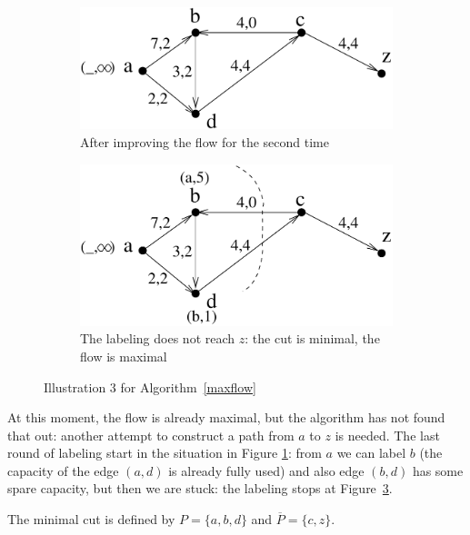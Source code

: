 \begin{figure}[ht]
	\centering
	\begin{subfigure}{0.41\linewidth}
		\vspace{1.2em}
		\centering
		\includegraphics[width=\linewidth,keepaspectratio]{maxflow5}
		\caption{After improving the flow for the second time}
		\label{maxflow5}
	\end{subfigure}\qquad\qquad
	\begin{subfigure}{0.41\linewidth}
		\centering
		\includegraphics[width=\linewidth,keepaspectratio]{maxflow6}
		\caption{The labeling does not reach $z$: the cut is minimal, the flow is maximal}
		\label{maxflow6}
	\end{subfigure}
	\caption{Illustration 3 for Algorithm~\ref{maxflow}}
\end{figure}

At this moment, the flow is already maximal, but the algorithm has not
found that out: another attempt to construct a path from $a$ to $z$ is
needed. The last round of labeling start in the situation in Figure
\ref{maxflow5}: from $a$ we can label $b$ (the capacity of the edge
$(a,d)$ is already fully used) and also edge $(b,d)$ has some spare
capacity, but then we are stuck: the labeling stops at
Figure~\ref{maxflow6}.

The minimal cut is defined by $P = \{a,b,d\}$ and
$\overline{P} = \{c,z\}$.

